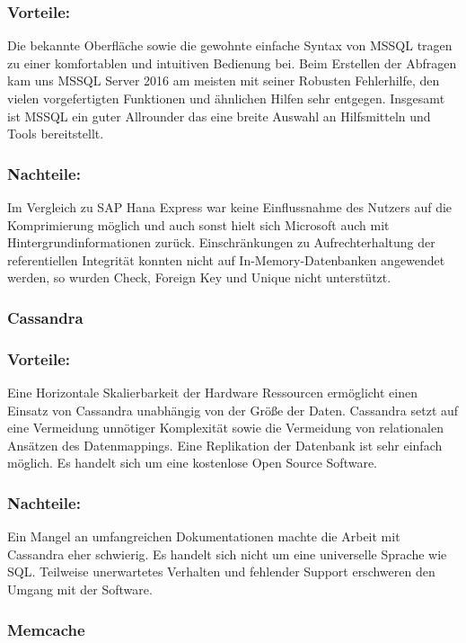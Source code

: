 \documentclass[a4paper, 12pt]{scrartcl}
\begin{document}
\subsubsection{Vorteile:}
Die bekannte Oberfläche sowie die gewohnte einfache Syntax von MSSQL tragen zu einer komfortablen und intuitiven Bedienung bei.
Beim Erstellen der Abfragen kam uns MSSQL Server 2016 am meisten mit seiner Robusten Fehlerhilfe, den vielen vorgefertigten Funktionen und ähnlichen Hilfen sehr entgegen.
Insgesamt ist MSSQL ein guter Allrounder das eine breite Auswahl an Hilfsmitteln und Tools bereitstellt.

\subsubsection{Nachteile: }
Im Vergleich zu SAP Hana Express war keine Einflussnahme des Nutzers auf die Komprimierung möglich und auch sonst hielt sich Microsoft auch mit Hintergrundinformationen zurück.
Einschränkungen zu Aufrechterhaltung der referentiellen Integrität konnten nicht auf In-Memory-Datenbanken angewendet werden, so wurden Check, Foreign Key und Unique nicht unterstützt.

\subsubsection{Cassandra}
\subsubsection{Vorteile:}
Eine Horizontale Skalierbarkeit der Hardware Ressourcen ermöglicht einen Einsatz von Cassandra unabhängig von der Größe der Daten.
Cassandra setzt auf eine Vermeidung unnötiger Komplexität sowie die Vermeidung von relationalen Ansätzen des Datenmappings. 
Eine Replikation der Datenbank ist sehr einfach möglich.
Es handelt sich um eine kostenlose Open Source Software.

\subsubsection{Nachteile:}
Ein Mangel an umfangreichen Dokumentationen machte die Arbeit mit Cassandra eher schwierig. 
Es handelt sich nicht um eine universelle Sprache wie SQL.
Teilweise unerwartetes Verhalten und fehlender Support erschweren den Umgang mit der Software.


\subsubsection{Memcache}
\end{document}

